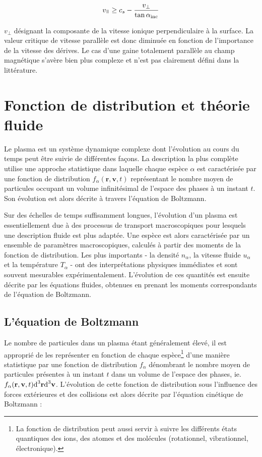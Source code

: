 \begin{refsection}
\begin{equation}
	v_\para\geq
	c_{s}-\frac{v_\perp}{\tan{\alpha_\text{inc}}}
\end{equation}
 
 $v_\perp$ désignant la composante de la vitesse ionique perpendiculaire à la
 surface. La valeur critique de vitesse parallèle est donc
 diminuée en fonction de l'importance de la vitesse des dérives. Le cas
 d'une gaine totalement parallèle au champ magnétique s'avère bien plus complexe
 et n'est pas clairement défini dans la littérature.

\section{Fonction de distribution et théorie fluide}
\label{Maxwell-Boltzmann}

Le plasma est un système dynamique complexe dont l'évolution au cours du temps
peut être suivie de différentes façons. La description la plus complète utilise
une approche statistique dans laquelle chaque espèce $\alpha$ est caractérisée
par une fonction de distribution $f_\alpha(\mathbf{r},\mathbf{v},t)$
représentant le nombre moyen de particules occupant un volume infinitésimal
de l'espace des phases à un instant $t$. Son évolution est alors décrite à
travers l'équation de Boltzmann.

Sur des échelles de temps suffisamment longues, l'évolution d'un plasma est 
essentiellement due à des processus de transport macroscopiques pour lesquels
une description fluide est plus adaptée. Une espèce est alors
caractérisée par un ensemble de paramètres macroscopiques, calculés à
partir des moments de la fonction de distribution. Les plus importants -
la densité $n_\alpha$, la vitesse fluide $u_\alpha$ et la température $T_\alpha$
- ont des interprétations physiques immédiates et sont souvent mesurables
expérimentalement. L'évolution de ces quantités est ensuite décrite par les
équations fluides, obtenues en prenant les moments correspondants de l'équation de Boltzmann.

\subsection{L'équation de Boltzmann}
Le nombre de particules dans un plasma étant généralement élevé, il est
approprié de les représenter en fonction de chaque
espèce\footnote{La fonction de
distribution peut aussi servir à suivre les différents états quantiques des
ions, des atomes et des molécules (rotationnel, vibrationnel, électronique).}
d'une manière statistique par une fonction de
distribution $f_\alpha$ dénombrant le nombre moyen de particules présentes à un
instant $t$ dans un volume de l'espace des phases, ie. $f_\alpha(\mathbf
r,\mathbf v,t)\text{d}^{{3}}\mathbf r\text{d}^{{3}}\mathbf v$.
L'évolution de cette fonction de distribution sous l'influence des forces
extérieures et des collisions est alors décrite par l'équation cinétique de
Boltzmann :


\end{refsection}
